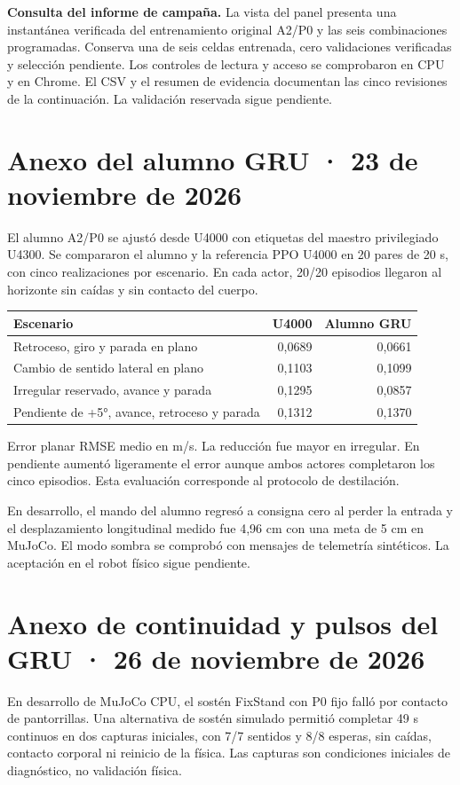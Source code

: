 \documentclass[11pt]{article}
\begin{document}
\medskip
\textbf{Consulta del informe de campaña.} La vista del panel presenta una instantánea verificada del entrenamiento original A2/P0 y las seis combinaciones programadas. Conserva una de seis celdas entrenada, cero validaciones verificadas y selección pendiente. Los controles de lectura y acceso se comprobaron en CPU y en Chrome. El CSV y el resumen de evidencia documentan las cinco revisiones de la continuación. La validación reservada sigue pendiente.

\newpage
\section*{Anexo del alumno GRU · 23 de noviembre de 2026}
El alumno A2/P0 se ajustó desde U4000 con etiquetas del maestro privilegiado U4300. Se compararon el alumno y la referencia PPO U4000 en 20 pares de 20 s, con cinco realizaciones por escenario. En cada actor, 20/20 episodios llegaron al horizonte sin caídas y sin contacto del cuerpo.
\begin{center}
\begin{tabular}{lrr}
\toprule
Escenario & U4000 & Alumno GRU \\
\midrule
Retroceso, giro y parada en plano & 0,0689 & 0,0661 \\
Cambio de sentido lateral en plano & 0,1103 & 0,1099 \\
Irregular reservado, avance y parada & 0,1295 & 0,0857 \\
Pendiente de +5°, avance, retroceso y parada & 0,1312 & 0,1370 \\
\bottomrule
\end{tabular}
\end{center}
\noindent Error planar RMSE medio en m/s. La reducción fue mayor en irregular. En pendiente aumentó ligeramente el error aunque ambos actores completaron los cinco episodios. Esta evaluación corresponde al protocolo de destilación.
\medskip

\noindent En desarrollo, el mando del alumno regresó a consigna cero al perder la entrada y el desplazamiento longitudinal medido fue 4,96 cm con una meta de 5 cm en MuJoCo. El modo sombra se comprobó con mensajes de telemetría sintéticos. La aceptación en el robot físico sigue pendiente.

\newpage
\section*{Anexo de continuidad y pulsos del GRU · 26 de noviembre de 2026}
En desarrollo de MuJoCo CPU, el sostén FixStand con P0 fijo falló por contacto de pantorrillas. Una alternativa de sostén simulado permitió completar 49 s continuos en dos capturas iniciales, con 7/7 sentidos y 8/8 esperas, sin caídas, contacto corporal ni reinicio de la física. Las capturas son condiciones iniciales de diagnóstico, no validación física.
\end{document}
